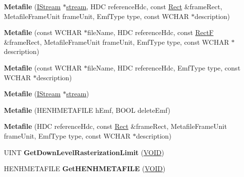 \begin{DoxyCompactItemize}
\item 
\mbox{\label{class_metafile_a11a757690e52e8911256cdeb902fd226}} 
{\bfseries Metafile} (\hyperlink{interface_i_stream}{I\+Stream} $\ast$\hyperlink{structstream}{stream}, H\+DC reference\+Hdc, const \hyperlink{struct_rect}{Rect} \&frame\+Rect, Metafile\+Frame\+Unit frame\+Unit, Emf\+Type type, const W\+C\+H\+AR $\ast$description)
\item 
\mbox{\label{class_metafile_ad9dafb7e24460dd00fd67ac33255e50b}} 
{\bfseries Metafile} (const W\+C\+H\+AR $\ast$file\+Name, H\+DC reference\+Hdc, const \hyperlink{struct_rect_f}{RectF} \&frame\+Rect, Metafile\+Frame\+Unit frame\+Unit, Emf\+Type type, const W\+C\+H\+AR $\ast$description)
\item 
\mbox{\label{class_metafile_a8ce6aac01f8b7931726d787c7658b292}} 
{\bfseries Metafile} (const W\+C\+H\+AR $\ast$file\+Name, H\+DC reference\+Hdc, Emf\+Type type, const W\+C\+H\+AR $\ast$description)
\item 
\mbox{\label{class_metafile_a737a3e9aaa2057942d046a0899a6bc72}} 
{\bfseries Metafile} (\hyperlink{interface_i_stream}{I\+Stream} $\ast$\hyperlink{structstream}{stream})
\item 
\mbox{\label{class_metafile_aaa246681a2aa6a35d850ee5d5582c14c}} 
{\bfseries Metafile} (H\+E\+N\+H\+M\+E\+T\+A\+F\+I\+LE h\+Emf, B\+O\+OL delete\+Emf)
\item 
\mbox{\label{class_metafile_a19839de20036d79544d3b2c2616b4a40}} 
{\bfseries Metafile} (H\+DC reference\+Hdc, const \hyperlink{struct_rect}{Rect} \&frame\+Rect, Metafile\+Frame\+Unit frame\+Unit, Emf\+Type type, const W\+C\+H\+AR $\ast$description)
\item 
\mbox{\label{class_metafile_a19637993ee1e4f0b34fdd43c672f8625}} 
U\+I\+NT {\bfseries Get\+Down\+Level\+Rasterization\+Limit} (\hyperlink{interfacevoid}{V\+O\+ID})
\item 
\mbox{\label{class_metafile_ae0c17ffba5a0c3a8afda92c9036db657}} 
H\+E\+N\+H\+M\+E\+T\+A\+F\+I\+LE {\bfseries Get\+H\+E\+N\+H\+M\+E\+T\+A\+F\+I\+LE} (\hyperlink{interfacevoid}{V\+O\+ID})

\end{DoxyCompactItemize}
